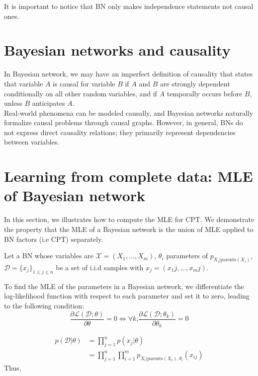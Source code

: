 \documentclass[12pt, a4paper]{article}
\theoremstyle{definition}
\numberwithin{figure}{section}
\numberwithin{equation}{section}
\numberwithin{table}{section}
\begin{document}

It is important to notice that BN only makes independence statements not causal ones.

\section{Bayesian networks and causality}
In Bayesian network, we may have an imperfect definition of causality that states that variable $A$ is causal for variable $B$ if $A$ and $B$ are strongly dependent conditionally on all other random variables, and if $A$ temporally occurs before $B$, unless $B$ anticipates $A$.\\

Real-world phenomena can be modeled causally, and Bayesian networks naturally formalize causal problems through causal graphs. However, in general, BNs do not express direct causality relations; they primarily represent dependencies between variables.


\section{Learning from complete data: MLE of Bayesian network}
In this section, we illustrates how to compute the MLE for CPT. We demonstrate the property that the MLE of a Bayesian network is the union of MLE applied to BN factors (i.e CPT) separately.

Let a BN whose variables are $\mathcal{X}=(X_1,\dots,X_m)$, $\theta_i$ parameters of $p_{X_i|\text{parents}(X_i)}$, $\mathcal{D}=\{x_j\}_{1 \leq j \leq n}$ be a set of i.i.d samples with $x_j=(x_1j,\dots,x_mj)$.

To find the MLE of the parameters in a Bayesian network, we differentiate the log-likelihood function with respect to each parameter and set it to zero, leading to the following condition:
\begin{equation}
\label{eq:mle-bn1}
    \frac{\partial \mathcal{L}(\mathcal{D}; \theta)}{\partial \theta}=0 \Leftrightarrow \forall k \text{,} \frac{\partial \mathcal{L}(\mathcal{D}; \theta_k)}{\partial \theta_k}=0
\end{equation}

\begin{align}
p(\mathcal{D}|\theta)
&= \prod_{j=1}^n p(x_j|\theta)\\
&= \prod_{j=1}^n \prod_{i=1}^m p_{X_i|\text{parents}(X_i),\theta_i}(x_{ij})
\end{align}
Thus,
\end{document}
